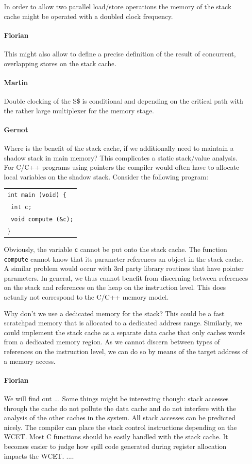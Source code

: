 \documentclass{IEEEtran}
\newcommand{\comment}[3]{\paragraph*{\textbf{#1}}{\color{#3}#2}}
\newcommand{\martin}[1]{\comment{Martin}{#1}{Blue}}
\newcommand{\gebhard}[1]{\comment{Gernot}{#1}{RedOrange}}
\newcommand{\fb}[1]{\comment{Florian}{#1}{Emerald}}
\begin{document}
In order to allow two parallel load/store operations the memory of the stack
cache might be operated with a doubled clock frequency.

\fb{This might also allow to define a precise definition of the result of
    concurrent, overlapping stores on the stack cache.}
\martin{Double clocking of the S\$ is conditional and depending on
the critical path with the rather large multiplexer for the memory stage.}

\gebhard{Where is the benefit of the stack cache, if we additionally need to maintain a shadow stack in main memory?
This complicates a static stack/value analysis.
For C/C++ programs using pointers the compiler would often have to allocate local variables on the shadow stack.
Consider the following program:

\begin{tabular}{l}
\texttt{int main (void) \{} \\
\texttt{  int c;} \\
\texttt{  void compute (\&c);} \\
\texttt{\}} \\
\end{tabular}

Obviously, the variable \texttt{c} cannot be put onto the stack cache.
The function \texttt{compute} cannot know that its parameter references an object in the stack cache.
A similar problem would occur with 3rd party library routines that have pointer parameters.
In general, we thus cannot benefit from discerning between references on the stack and references on the heap on the instruction level.
This does actually not correspond to the C/C++ memory model.

Why don't we use a dedicated memory for the stack?
This could be a fast scratchpad memory that is allocated to a dedicated address range.
Similarly, we could implement the stack cache as a separate data cache that only caches words from a dedicated memory region.
As we cannot discern between types of references on the instruction level, we can do so by means of the target address of a memory access.}

\fb{We will find out ... Some things might be interesting though: stack accesses
through the cache do not pollute the data cache and do not interfere with the
analysis of the other caches in the system. All stack accesses can be predicted
nicely. The compiler can place the stack control instructions depending on the
WCET. Most C functions should be easily handled with the stack cache. It becomes
easier to judge how spill code generated during register allocation impacts the
WCET. .... }
\end{document}
